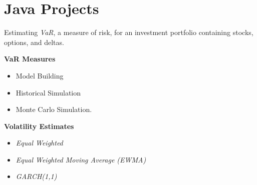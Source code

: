 \documentclass[letterpaper,11pt]{article}
\begin{document}
\section{Java Projects}
\begin{description}[style=multiline,leftmargin=4cm]

	\item[Value at Risk \textnormal{Dissertation} \textnormal{\tiny
		      \href{https://adrian.ng/java/var/}{adrian.ng/java/var/}}]
	      Estimating \textit{VaR}, a measure of risk, for an investment portfolio containing stocks, options, and deltas.

	      \begin{minipage}[b]{0.2\textwidth}
		      \vspace{0.5cm}
		      \textbf{VaR Measures}
		      \begin{itemize}[leftmargin=*]
			      \tiny
			      \item Model Building
			      \item Historical Simulation
			      \item Monte Carlo Simulation.
		      \end{itemize}
		      \textbf{Volatility Estimates}
		      \begin{itemize}[leftmargin=*]
			      \tiny
			      \item \textit{Equal Weighted}
			      \item \textit{Equal Weighted Moving Average (EWMA)}
			      \item \textit{GARCH(1,1)}
		      \end{itemize}
	      \end{minipage}
	      \hspace{0.25cm}
	      \begin{minipage}[b]{0.55\textwidth}


\end{minipage}
\end{description}
\end{document}
